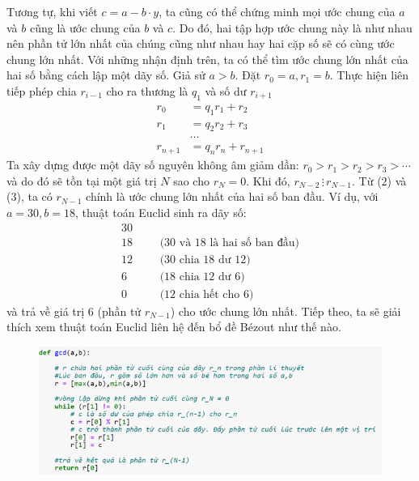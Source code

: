 \begin{multicols}{2}
	\vskip 0.1cm
	Tương tự, khi viết $c=a-b\cdot y$, ta cũng có thể chứng minh mọi ước chung của $a$ và $b$ cũng là ước chung của $b$ và $c$. 
	\vskip 0.1cm
	Do đó, hai tập hợp ước chung này là như nhau nên phần tử lớn nhất của chúng cũng như nhau hay hai cặp số sẽ có cùng ước chung lớn nhất.
	\vskip 0.1cm
	Với những nhận định trên, ta có thể tìm ước chung lớn nhất của hai số bằng cách lập một dãy số. Giả sử $a>b$. Đặt $r_0=a,r_1=b$. Thực hiện liên tiếp phép chia $r_{i-1}$ cho ra thương là $q_1$ và số dư $r_{i+1}$
	\setlength{\abovedisplayskip}{5pt}
	\setlength{\belowdisplayskip}{5pt}
	\begin{align*}
		r_0 &= q_1r_1 + r_2\\
		r_1 &= q_2r_2 + r_3\\
		&\ldots\\
		r_{n+1} &= q_nr_n + r_{n+1}
	\end{align*}
	Ta xây dựng được một dãy số nguyên không âm giảm dần: $r_0>r_1>r_2>r_3>\cdots$ và do đó sẽ tồn tại một giá trị $N$ sao cho $r_N=0$. Khi đó, $r_{N-2}\,\vdots\,r_{N-1}$. Từ ($2$) và ($3$), ta có $r_{N-1}$ chính là ước chung lớn nhất của hai số ban đầu.
	\vskip 0.1cm
	Ví dụ, với $a=30,b=18$, thuật toán Euclid sinh ra dãy số:
	\begin{align*}
		30&	&&\\
		18&	&&\text{($30$ và $18$ là hai số ban đầu)}\\	
		12&	&&\text{($30$ chia $18$ dư $12$)}\\
		6&	&&\text{($18$ chia $12$ dư $6$)}\\
		0&	&&\text{($12$ chia hết cho $6$)}
	\end{align*}
	và trả về giá trị $6$ (phần tử $r_{N-1}$) cho ước chung lớn nhất.
	\vskip 0.1cm
	Tiếp theo, ta sẽ giải thích xem thuật toán Euclid liên hệ đến bổ đề Bézout như thế nào. 
	\end{multicols}
	\begin{figure}[H]
		\centering
		\captionsetup{labelformat= empty, justification=centering}
		\includegraphics[width=1\linewidth]{2}
		\vspace*{-15pt}
	\end{figure}
